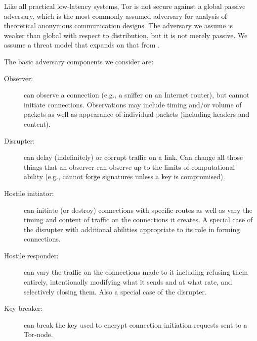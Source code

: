 \documentclass[times,10pt,twocolumn]{article}
\begin{document}
Like all practical low-latency systems, Tor is not secure against a
global passive adversary, which is the most commonly assumed adversary
for analysis of theoretical anonymous communication designs. The adversary
we assume
is weaker than global with respect to distribution, but it is not
merely passive.
We assume a threat model that expands on that from \cite{or-pet00}.


The basic adversary components we consider are:
\begin{description}
\item[Observer:] can observe a connection (e.g., a sniffer on an
  Internet router), but cannot initiate connections. Observations may
  include timing and/or volume of packets as well as appearance of
  individual packets (including headers and content).
\item[Disrupter:] can delay (indefinitely) or corrupt traffic on a
  link. Can change all those things that an observer can observe up to
  the limits of computational ability (e.g., cannot forge signatures
  unless a key is compromised).
\item[Hostile initiator:] can initiate (or destroy) connections with
  specific routes as well as vary the timing and content of traffic
  on the connections it creates. A special case of the disrupter with
  additional abilities appropriate to its role in forming connections.
\item[Hostile responder:] can vary the traffic on the connections made
  to it including refusing them entirely, intentionally modifying what
  it sends and at what rate, and selectively closing them. Also a
  special case of the disrupter.
\item[Key breaker:] can break the key used to encrypt connection
  initiation requests sent to a Tor-node.
%

\end{description}
\end{document}
